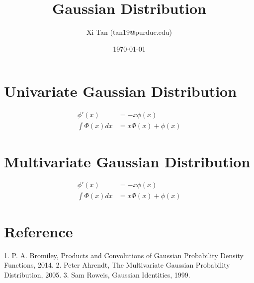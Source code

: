 \documentclass{article}
\title{Gaussian Distribution}
\author{Xi Tan (tan19@purdue.edu)}
\date{\today}
\begin{document}
\maketitle
\tableofcontents

\section{Univariate Gaussian Distribution}
\begin{align}
	\phi'(x) &= -x\phi(x)\\
	\int \Phi(x) dx &= x\Phi(x)+\phi(x)
\end{align}

\section{Multivariate Gaussian Distribution}
\begin{align}
	\phi'(x) &= -x\phi(x)\\
	\int \Phi(x) dx &= x\Phi(x)+\phi(x)
\end{align}


\section{Reference}
1. P. A. Bromiley, Products and Convolutions of Gaussian Probability Density Functions, 2014.
2. Peter Ahrendt, The Multivariate Gaussian Probability Distribution, 2005.
3. Sam Roweis, Gaussian Identities, 1999.
\end{document}
